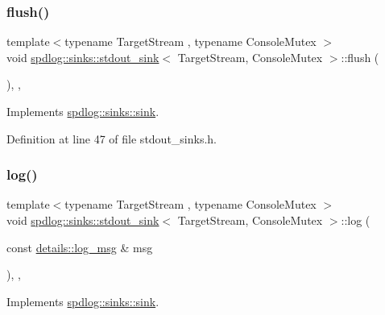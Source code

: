 \subsubsection{\texorpdfstring{flush()}{flush()}}
{\footnotesize\ttfamily template$<$typename Target\+Stream , typename Console\+Mutex $>$ \\
void \hyperlink{classspdlog_1_1sinks_1_1stdout__sink}{spdlog\+::sinks\+::stdout\+\_\+sink}$<$ Target\+Stream, Console\+Mutex $>$\+::flush (\begin{DoxyParamCaption}{ }\end{DoxyParamCaption})\hspace{0.3cm}{\ttfamily [inline]}, {\ttfamily [override]}, {\ttfamily [virtual]}}



Implements \hyperlink{classspdlog_1_1sinks_1_1sink_a8a0674ae3bca8f1617aef820e23a2ccd}{spdlog\+::sinks\+::sink}.



Definition at line 47 of file stdout\+\_\+sinks.\+h.

\mbox{\label{classspdlog_1_1sinks_1_1stdout__sink_adda1fffa1daf4565f72b3e94734d984a}} 
\subsubsection{\texorpdfstring{log()}{log()}}
{\footnotesize\ttfamily template$<$typename Target\+Stream , typename Console\+Mutex $>$ \\
void \hyperlink{classspdlog_1_1sinks_1_1stdout__sink}{spdlog\+::sinks\+::stdout\+\_\+sink}$<$ Target\+Stream, Console\+Mutex $>$\+::log (\begin{DoxyParamCaption}\item[{const \hyperlink{structspdlog_1_1details_1_1log__msg}{details\+::log\+\_\+msg} \&}]{msg }\end{DoxyParamCaption})\hspace{0.3cm}{\ttfamily [inline]}, {\ttfamily [override]}, {\ttfamily [virtual]}}



Implements \hyperlink{classspdlog_1_1sinks_1_1sink_a51d8f34ad79064e0dc13c6013236e427}{spdlog\+::sinks\+::sink}.




